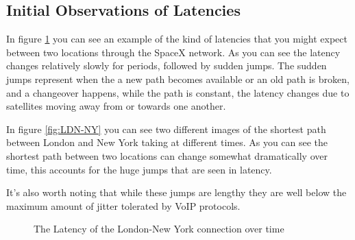 \documentclass[12pt]{report}
\begin{document}
\subsection{Initial Observations of Latencies}

In figure \ref{fig:Latency London To New York} you can see an example of the kind of latencies that you might expect between two locations through the SpaceX network. As you can see the latency changes relatively slowly for periods, followed by sudden jumps. The sudden jumps represent when the a new path becomes available or an old path is broken, and a changeover happens, while the path is constant, the latency changes due to satellites moving away from or towards one another.

In figure \ref{fig:LDN-NY} you can see two different images of the shortest path between London and New York taking at different times. As you can see the shortest path between two locations can change somewhat dramatically over time, this accounts for the huge jumps that are seen in latency.

It's also worth noting that while these jumps are lengthy they are well below the maximum amount of jitter tolerated by VoIP protocols.\cite{HowMuchJitter}

\begin{figure}
\caption{The Latency of the London-New York connection over time}
\label{fig:Latency London To New York}
\end{figure}
\end{document}
